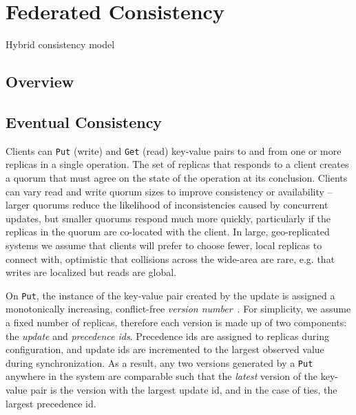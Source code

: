 
\renewcommand{\thechapter}{4}

\chapter{Federated Consistency}
\label{ch:federated_consistency}

Hybrid consistency model

\section{Overview}

\section{Eventual Consistency}


Clients can \texttt{Put} (write) and \texttt{Get} (read) key-value pairs to
 and from one or more replicas in a single operation.
The set of replicas that responds to a client creates a quorum that must
agree on the state of the operation at its conclusion.
Clients can vary read and write quorum sizes to improve consistency or
availability -- larger quorums reduce the likelihood of inconsistencies
caused by concurrent updates, but smaller quorums respond much more quickly,
particularly if the replicas in the quorum are co-located with the client.
In large, geo-replicated systems we assume that clients will prefer to choose
fewer, local replicas to connect with, optimistic that collisions across the
wide-area are rare, e.g. that writes are localized but reads are global.

On \texttt{Put}, the instance of the key-value pair created by the update is
assigned a monotonically increasing, conflict-free \textit{version
number}~\cite{version_conflict_detection,version_vectors}.
For simplicity, we assume a fixed number of replicas, therefore each version
is made up of two components: the \textit{update} and \textit{precedence ids}.
Precedence ids are assigned to replicas during configuration, and update ids
are incremented to the largest observed value during synchronization.
As a result, any two versions generated by a \texttt{Put} anywhere in the
system are comparable such that the \textit{latest} version of the key-value
pair is the version with the largest update id, and in the case of ties, the
largest precedence id.


